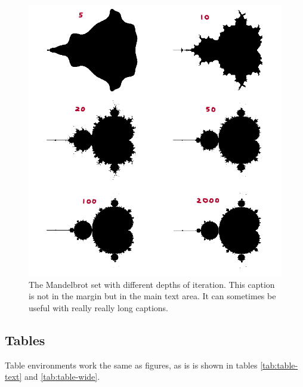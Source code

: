 \begin{figure}[htb!]
    \includegraphics[width =.7\linewidth]{figures/mandelbrot.png}
    \caption[The Mandelbrot set with different depths of iteration. This caption is not in the margin but in the main text area. It can sometimes be useful with really really long captions.]{The Mandelbrot set with different depths of iteration. This caption is not in the margin but in the main text area. It can sometimes be useful with really really long captions. \lipsum[1]\label{fig:figure-plain}}

\end{figure}

\newpage
\subsection{Tables}

Table environments work the same as figures, as is is shown in tables \ref{tab:table-text} and \ref{tab:table-wide}.

